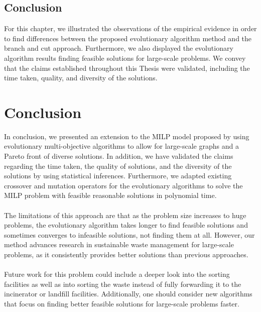 \documentclass[mscthesis, 11pt]{usiinfthesis}
\theoremstyle{newdefinition}
\begin{document}
\section{Conclusion}
For this chapter, we illustrated the observations of the empirical evidence in order to find differences between the proposed evolutionary algorithm method and the branch and cut approach. Furthermore, we also displayed the evolutionary algorithm results finding feasible solutions for large-scale problems. We convey that the claims established throughout this Thesis were validated, including the time taken, quality, and diversity of the solutions. 
\clearpage
\chapter[Conclusion]{Conclusion}
In conclusion, we presented an extension to the MILP model proposed by \cite{olapiriyakul_multiobjective_2019} using evolutionary multi-objective algorithms to allow for large-scale graphs and a Pareto front of diverse solutions. In addition, we have validated the claims regarding the time taken, the quality of solutions, and the diversity of the solutions by using statistical inferences. Furthermore, we adapted existing crossover and mutation operators for the evolutionary algorithms to solve the MILP problem with feasible reasonable solutions in polynomial time.
\\\\
The limitations of this approach are that as the problem size increases to huge problems, the evolutionary algorithm takes longer to find feasible solutions and sometimes converges to infeasible solutions, not finding them at all.
However, our method advances research in sustainable waste management for large-scale problems, as it consistently provides better solutions than previous approaches. 
\\\\
Future work for this problem could include a deeper look into the sorting facilities as well as into sorting the waste instead of fully forwarding it to the incinerator or landfill facilities. Additionally, one should consider new algorithms that focus on finding better feasible solutions for large-scale problems faster.

\backmatter


% 
% 



\end{document}
